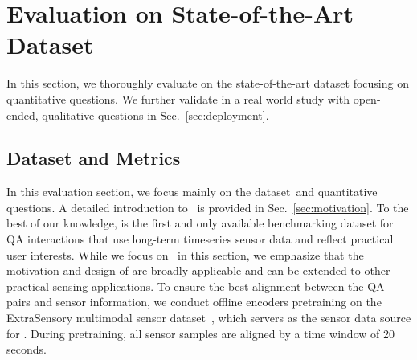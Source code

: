 \vspace{-2mm}
\section{Evaluation on State-of-the-Art Dataset}
\label{sec:evaluation}

In this section, we thoroughly evaluate \Method on the state-of-the-art dataset focusing on quantitative questions. We further validate \Method in a real world study with open-ended, qualitative questions in Sec.~\ref{sec:deployment}.


\subsection{Dataset and Metrics}

In this evaluation section, we focus mainly on the \Dataset dataset~\citesensorqa and quantitative questions. A detailed introduction to \Dataset~\citesensorqa is provided in Sec.~\ref{sec:motivation}. 
To the best of our knowledge, \Dataset is the first and only available benchmarking dataset for QA interactions that use long-term timeseries sensor data and reflect practical user interests.
While we focus on \Dataset~\citesensorqa in this section, we emphasize that the motivation and design of \Method are broadly applicable and can be extended to other practical sensing applications.
To ensure the best alignment between the QA pairs and sensor information, we conduct offline encoders pretraining on the ExtraSensory multimodal sensor dataset~\cite{vaizman2017recognizing}, which servers as the sensor data source for \Dataset.
During pretraining, all sensor samples are aligned by a time window of 20 seconds.




